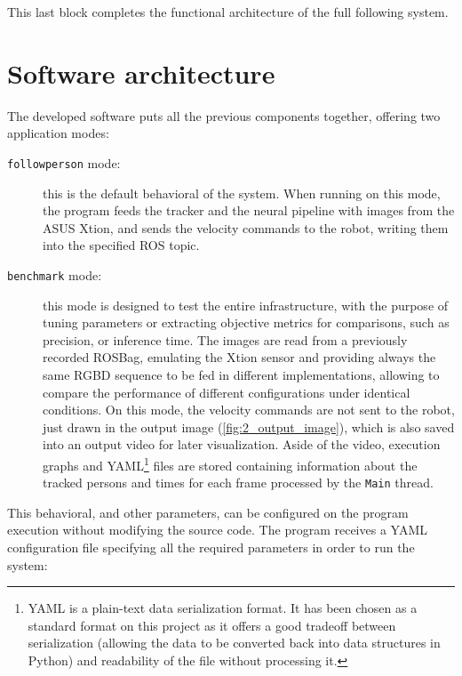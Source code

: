 This last block completes the functional architecture of the full following system.

\section{Software architecture}

The developed software puts all the previous components together, offering two application modes:
\begin{description}
	\item[\texttt{followperson} mode:] this is the default behavioral of the system. When running on this mode, the program feeds the tracker and the neural pipeline with images from the ASUS Xtion, and sends the velocity commands to the robot, writing them into the specified ROS topic.
	
	\item[\texttt{benchmark} mode:] this mode is designed to test the entire infrastructure, with the purpose of tuning parameters or extracting objective metrics for comparisons, such as precision, or inference time. The images are read from a previously recorded ROSBag, emulating the Xtion sensor and providing always the same RGBD sequence to be fed in different implementations, allowing to compare the performance of different configurations under identical conditions. On this mode, the velocity commands are not sent to the robot, just drawn in the output image (\autoref{fig:2_output_image}), which is also saved into an output video for later visualization. Aside of the video, execution graphs and YAML\footnote{YAML is a plain-text data serialization format. It has been chosen as a standard format on this project as it offers a good tradeoff between serialization (allowing the data to be converted back into data structures in Python) and  readability of the file without processing it.} files are stored containing information about the tracked persons and times for each frame processed by the \texttt{Main} thread.
\end{description}

This behavioral, and other parameters, can be configured on the program execution without modifying the source code. The program receives a YAML configuration file specifying all the required parameters in order to run the system:

